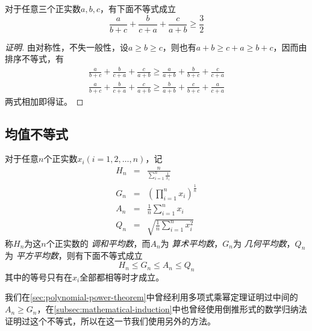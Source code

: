 \begin{example}
  \label{example:nesbitt-inequality-proof-by-sorted-inequality}
  对于任意三个正实数$a,b,c$，有下面不等式成立
  \begin{equation}
    \label{eq:nesbitt-inequality}
    \frac{a}{b+c} + \frac{b}{c+a} + \frac{c}{a+b} \geqslant \frac{3}{2}
  \end{equation}

  \begin{proof}[证明]
    由对称性，不失一般性，设$a\geqslant b \geqslant c$，则也有$a+b \geqslant c+a \geqslant b+c$，因而由排序不等式，有
    \begin{eqnarray*}
     \frac{a}{b+c} + \frac{b}{c+a} + \frac{c}{a+b} \geqslant \frac{a}{a+b} + \frac{b}{b+c} + \frac{c}{c+a} \\ 
     \frac{a}{b+c} + \frac{b}{c+a} + \frac{c}{a+b} \geqslant \frac{b}{a+b} + \frac{c}{b+c} + \frac{a}{c+a}  
    \end{eqnarray*}
    两式相加即得证。
  \end{proof}
\end{example}


\subsection{均值不等式}

\begin{theorem}[均值不等式]
  对于任意$n$个正实数$x_{i}(i=1,2,\ldots,n)$，记
  \begin{eqnarray}
    \label{eq:definition-of-average}
    H_n &=& \frac{n}{\sum_{i=1}^n \frac{1}{x_i}} \\
    G_n &=& (\prod_{i=1}^nx_{i})^{\frac{1}{n}} \\
    A_n &=& \frac{1}{n}\sum_{i=1}^{n}x_i \\
    Q_n &=& \sqrt{\frac{1}{n}\sum_{i=1}^nx_i^2}
  \end{eqnarray}
  称$H_{n}$为这$n$个正实数的 \emph{调和平均数}，而$A_{n}$为 \emph{算术平均数}，$G_n$为 \emph{几何平均数}，$Q_{n}$为 \emph{平方平均数}，则有下面不等式成立
  \begin{equation}
    \label{eq:mean-inequation-general}
    H_{n} \leqslant G_{n} \leqslant A_{n} \leqslant Q_{n}
  \end{equation}
  其中的等号只有在$x_{i}$全部都相等时才成立。
\end{theorem}

我们在\autoref{sec:polynomial-power-theorem}中曾经利用多项式乘幂定理证明过中间的$A_n \geqslant G_n$，在\autoref{subsec:mathematical-induction}中也曾经使用倒推形式的数学归纳法证明过这个不等式，所以在这一节我们使用另外的方法。

